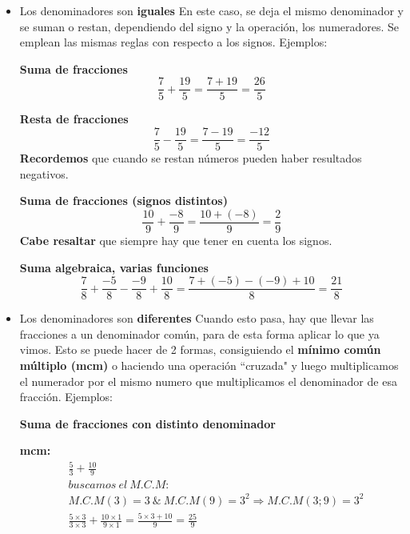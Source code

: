 \documentclass[12pt]{article}
\newcommand{\comillas}[1]{``#1"}
\begin{document}
    \begin{itemize}
        \item Los denominadores son \textbf{iguales}
            En este caso, se deja el mismo denominador y se suman o restan,
            dependiendo del signo y la operación, los
            numeradores. Se emplean las mismas reglas con respecto a los signos. Ejemplos:

            \textbf{Suma de fracciones}
            $$\frac{7}{5} + \frac{19}{5} = \frac{7+19}{5} = \frac{26}{5}$$

            \textbf{Resta de fracciones}
            $$\frac{7}{5} - \frac{19}{5} = \frac{7-19}{5} = \frac{-12}{5}$$
            \textbf{Recordemos} que cuando se restan números pueden haber
            resultados negativos.

            \textbf{Suma de fracciones (signos distintos)}
            $$ \frac{10}{9} + \frac{-8}{9} = \frac{10 + (-8)}{9}  = \frac{2}{9}$$
            \textbf{Cabe resaltar} que siempre hay que tener en cuenta los signos.

            \textbf{Suma algebraica, varias funciones}
            $$\frac{7}{8} + \frac{-5}{8} - \frac{-9}{8} + \frac{10}{8} =
            \frac{7+(-5)-(-9)+10}{8} = \frac{21}{8} $$

        \item Los denominadores son \textbf{diferentes}
            Cuando esto pasa, hay que llevar las fracciones a un denominador común,
            para de esta forma aplicar lo que ya vimos. Esto se puede hacer de
            2 formas, consiguiendo el \textbf{mínimo común múltiplo (mcm)} o
            haciendo una operación \comillas{cruzada} y luego multiplicamos el
            numerador por el mismo numero que multiplicamos el denominador de
            esa fracción. Ejemplos:

            \textbf{Suma de fracciones con distinto denominador}

            \textbf{mcm:}
            \begin{align*}
                &\frac{5}{3} + \frac{10}{9}\\
                &buscamos\ el\ M.C.M:\\
                &M.C.M(3) = 3\  \&\  M.C.M(9) = 3^2 \Rightarrow M.C.M(3;9) = 3^2\\
                &\frac{5\times3}{3\times3} + \frac{10\times1}{9\times1} = \frac{5\times3+10}{9} = \frac{25}{9}
            \end{align*}


\end{itemize}
\end{document}
